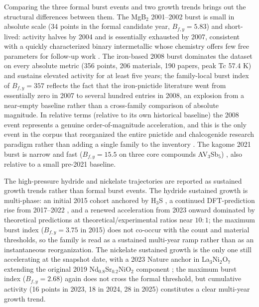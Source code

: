 \documentclass[11pt]{article}
\begin{document}
Comparing the three formal burst events and two growth trends brings out the structural differences between them. The MgB$_2$ 2001--2002 burst is small in absolute scale (34 points in the formal candidate year, $B_{f,y}=5.83$) and short-lived: activity halves by 2004 and is essentially exhausted by 2007, consistent with a quickly characterized binary intermetallic whose chemistry offers few free parameters for follow-up work \cite{nagamatsu2001mgb2}. The iron-based 2008 burst dominates the dataset on every absolute metric (356 points, 206 materials, 190 papers, peak Tc 57.4 K) and sustains elevated activity for at least five years; the family-local burst index of $B_{f,y}=357$ reflects the fact that the iron-pnictide literature went from essentially zero in 2007 to several hundred entries in 2008, an explosion from a near-empty baseline rather than a cross-family comparison of absolute magnitude. In relative terms (relative to its own historical baseline) the 2008 event represents a genuine order-of-magnitude acceleration, and this is the only event in the corpus that reorganized the entire pnictide and chalcogenide research paradigm rather than adding a single family to the inventory \cite{kamihara2008iron,stewart2011ironpnictidesreview,hosono2015ironreview}. The kagome 2021 burst is narrow and fast ($B_{f,y}=15.5$ on three core compounds AV$_3$Sb$_5$) \cite{ortiz2020kagomeKVSbsuperc,neupert2022kagomeNatPhys}, also relative to a small pre-2021 baseline.

The high-pressure hydride and nickelate trajectories are reported as sustained growth trends rather than formal burst events. The hydride sustained growth is multi-phase: an initial 2015 cohort anchored by H$_3$S \cite{drozdov2015h3s,somayazulu2019lahtenten}, a continued DFT-prediction rise from 2017--2022 \cite{floreslivas2020hydridereview,pickard2020hydridesARCMP}, and a renewed acceleration from 2023 onward dominated by theoretical predictions at theoretical/experimental ratios near $10{:}1$; the maximum burst index ($B_{f,y}=3.75$ in 2015) does not co-occur with the count and material thresholds, so the family is read as a sustained multi-year ramp rather than as an instantaneous reorganization. The nickelate sustained growth is the only one still accelerating at the snapshot date, with a 2023 Nature anchor in La$_3$Ni$_2$O$_7$ \cite{sun2023nickelate,nomura2022nickelatesreview} extending the original 2019 Nd$_{0.8}$Sr$_{0.2}$NiO$_2$ component \cite{li2019nickelate}; the maximum burst index ($B_{f,y}=2.68$) again does not cross the formal threshold, but cumulative activity (16 points in 2023, 18 in 2024, 28 in 2025) constitutes a clear multi-year growth trend.
\end{document}
